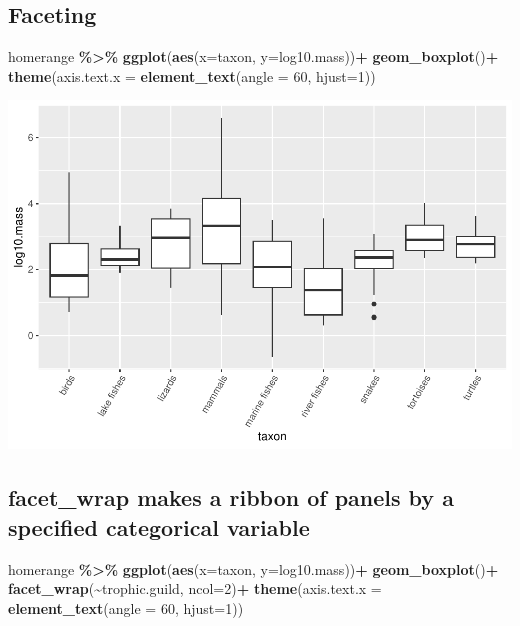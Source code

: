 \documentclass[
]{article}
\newenvironment{Shaded}{\begin{snugshade}}{\end{snugshade}}
\newcommand{\AttributeTok}[1]{\textcolor[rgb]{0.13,0.29,0.53}{#1}}
\newcommand{\DecValTok}[1]{\textcolor[rgb]{0.00,0.00,0.81}{#1}}
\newcommand{\FunctionTok}[1]{\textcolor[rgb]{0.13,0.29,0.53}{\textbf{#1}}}
\newcommand{\NormalTok}[1]{#1}
\newcommand{\SpecialCharTok}[1]{\textcolor[rgb]{0.81,0.36,0.00}{\textbf{#1}}}
\begin{document}
\hypertarget{faceting}{%
\subsection{Faceting}\label{faceting}}

\begin{Shaded}
\begin{Highlighting}[]
\NormalTok{homerange }\SpecialCharTok{\%\textgreater{}\%} 
  \FunctionTok{ggplot}\NormalTok{(}\FunctionTok{aes}\NormalTok{(}\AttributeTok{x=}\NormalTok{taxon, }\AttributeTok{y=}\NormalTok{log10.mass))}\SpecialCharTok{+}
  \FunctionTok{geom\_boxplot}\NormalTok{()}\SpecialCharTok{+}
  \FunctionTok{theme}\NormalTok{(}\AttributeTok{axis.text.x =} \FunctionTok{element\_text}\NormalTok{(}\AttributeTok{angle =} \DecValTok{60}\NormalTok{, }\AttributeTok{hjust=}\DecValTok{1}\NormalTok{))}
\end{Highlighting}
\end{Shaded}

\includegraphics{Untitled_files/figure-latex/unnamed-chunk-43-1.pdf}

\hypertarget{facet_wrap-makes-a-ribbon-of-panels-by-a-specified-categorical-variable}{%
\subsection{facet\_wrap makes a ribbon of panels by a specified
categorical
variable}\label{facet_wrap-makes-a-ribbon-of-panels-by-a-specified-categorical-variable}}

\begin{Shaded}
\begin{Highlighting}[]
\NormalTok{homerange }\SpecialCharTok{\%\textgreater{}\%} 
  \FunctionTok{ggplot}\NormalTok{(}\FunctionTok{aes}\NormalTok{(}\AttributeTok{x=}\NormalTok{taxon, }\AttributeTok{y=}\NormalTok{log10.mass))}\SpecialCharTok{+}
  \FunctionTok{geom\_boxplot}\NormalTok{()}\SpecialCharTok{+}
  \FunctionTok{facet\_wrap}\NormalTok{(}\SpecialCharTok{\textasciitilde{}}\NormalTok{trophic.guild, }\AttributeTok{ncol=}\DecValTok{2}\NormalTok{)}\SpecialCharTok{+}
  \FunctionTok{theme}\NormalTok{(}\AttributeTok{axis.text.x =} \FunctionTok{element\_text}\NormalTok{(}\AttributeTok{angle =} \DecValTok{60}\NormalTok{, }\AttributeTok{hjust=}\DecValTok{1}\NormalTok{))}
\end{Highlighting}
\end{Shaded}
\end{document}
